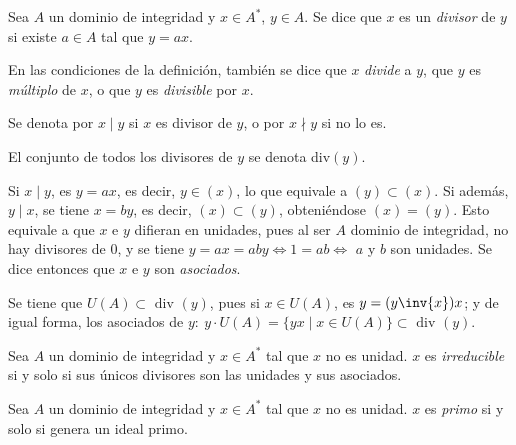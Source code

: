 
 
\begin{deff}[Divisor]{\cite[p.~35]{GamboaAnillos}}
    Sea $A$ un dominio de integridad y $x\in A^*$, $y\in A$. Se dice que $x$ es un \textit{divisor} de $y$ si existe $a\in A$ tal que $y = ax$.
\end{deff}

\begin{nott}
    \item En las condiciones de la definición, también se dice que $x$ \textit{divide} a $y$, que $y$ es \textit{múltiplo} de $x$, o que $y$ es \textit{divisible} por $x$.
    \item Se denota por $x\mid y$ si $x$ es divisor de $y$, o por $x\nmid y$ si no lo es.
    \item El conjunto de todos los divisores de $y$ se denota div$(y)$.
\end{nott}

\begin{obss}
    \item Si $x\mid y$, es $y = ax$, es decir, $y \in (x)$, lo que equivale a $(y) \subset (x)$. Si además, $y\mid x$, se tiene $x = by$, es decir, $(x) \subset (y)$, obteniéndose $(x) = (y)$. Esto equivale a que $x$ e $y$ difieran en unidades, pues al ser $A$ dominio de integridad, no hay divisores de 0, y se tiene $y = ax = aby \iff 1 = ab \iff$ $a$ y $b$ son unidades. Se dice entonces que $x$ e $y$ son \textit{asociados}. \cite[p. ~37]{Rosenberger}
    \item Se tiene que $U(A)\subset \text{ div } (y)$, pues si $x\in U(A)$, es $y = (y\inv{x})x$; y de igual forma, los asociados de $y: \ y\cdot U(A) = \{yx\mid x \in U(A)\} \subset \text{ div } (y)$.           
\end{obss}

\begin{deff}{\cite[p.~36]{GamboaAnillos}}
    Sea $A$ un dominio de integridad y $x\in A^*$ tal que $x$ no es unidad. $x$ es \textit{irreducible} si y solo si sus únicos divisores son las unidades y sus asociados.
\end{deff}

\begin{deff}{\cite[p.~36]{GamboaAnillos}}
    Sea $A$ un dominio de integridad y $x\in A^*$ tal que $x$ no es unidad. $x$ es \textit{primo} si y solo si genera un ideal primo.
\end{deff}

